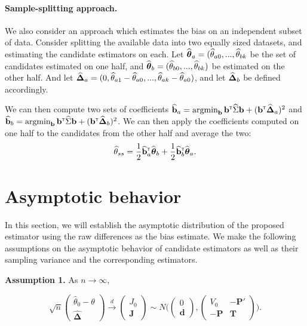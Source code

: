\documentclass{article}
\begin{document}
\paragraph{Sample-splitting approach.}
We also consider an approach which estimates the bias on an independent subset of data. Consider splitting the available data into two equally sized datasets, and estimating the candidate estimators on each. Let ${\widehat{\boldsymbol{\theta}}}_a = ({\widehat\theta}_{a0}, ..., {\widehat\theta}_{bk}$ be the set of candidates estimated on one half, and ${\widehat{\boldsymbol{\theta}}}_b = ({\widehat\theta}_{b0}, ..., {\widehat\theta}_{bk})$ be estimated on the other half. And let ${\widehat{\boldsymbol{\Delta}}}_a = (0, {\widehat\theta}_{a1} - {\widehat\theta}_{a0}, ..., {\widehat\theta}_{ak} - {\widehat\theta}_{a0})$, and let ${\widehat{\boldsymbol{\Delta}}}_b$ be defined accordingly. 

We can then compute two sets of coefficients ${\widehat {{\bf b}}}_a = \mathop{\mbox{argmin}}_{{\bf b}}{\bf b}^{{\sf \scriptscriptstyle{T}}}{\widehat\Sigma}{\bf b} + ({\bf b}^{{\sf \scriptscriptstyle{T}}} {\widehat{\boldsymbol{\Delta}}}_a)^2$ and ${\widehat {{\bf b}}}_b = \mathop{\mbox{argmin}}_{{\bf b}}{\bf b}^{{\sf \scriptscriptstyle{T}}}{\widehat\Sigma}{\bf b} + ({\bf b}^{{\sf \scriptscriptstyle{T}}} {\widehat{\boldsymbol{\Delta}}}_b)^2$. We can then apply the coefficients computed on one half to the candidates from the other half and average the two:
\[
{\widehat\theta}_{ss} = \frac{1}{2}{\widehat {{\bf b}}}_a^{{\sf \scriptscriptstyle{T}}}{\widehat{\boldsymbol{\theta}}}_b + \frac{1}{2}{\widehat {{\bf b}}}_b^{{\sf \scriptscriptstyle{T}}}{\widehat{\boldsymbol{\theta}}}_a.
\]



\section{Asymptotic behavior}
In this section, we will establish the asymptotic distribution of the proposed estimator using the raw differences as the bias estimate. We make the following assumptions on the asymptotic behavior of candidate estimators as well as their sampling variance and the corresponding estimators. 

\begin{flushleft}
\textbf{Assumption 1.}  As $n \to \infty$, 
\end{flushleft}
\begin{displaymath}
\sqrt{n}  \begin{pmatrix} \hat\theta_0 - \theta \\  \boldsymbol{\hat \Delta} \end{pmatrix} \xrightarrow{d} 
\begin{pmatrix} J_0 \\ \mathbf J \end{pmatrix} \sim
    N\Bigg( \begin{pmatrix} 0 \\ \mathbf d  \end{pmatrix},  \begin{pmatrix}    V_0 & -\mathbf P'  \\
                             -\mathbf P  & \mathbf T  \end{pmatrix} \Bigg).
\end{displaymath}
\end{document}
